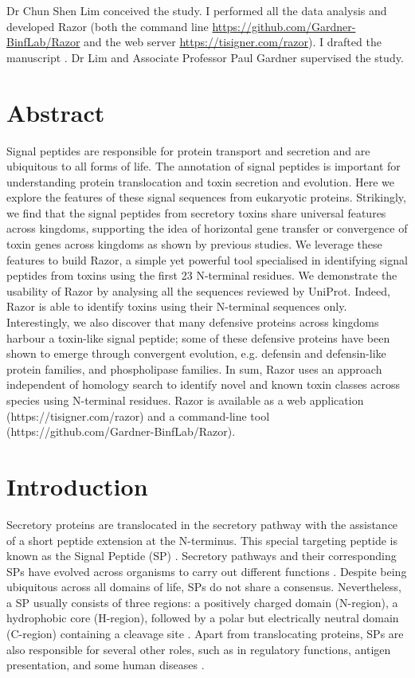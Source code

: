 Dr Chun Shen Lim conceived the study. I performed all the data analysis and developed Razor (both the command line \href{https://github.com/Gardner-BinfLab/Razor}{https://github.com/Gardner-BinfLab/Razor} and the web server \href{https://tisigner.com/razor}{https://tisigner.com/razor}). I drafted the manuscript \cite{Bhandari2020-oj}. Dr Lim and Associate Professor Paul Gardner supervised the study. 

\section{Abstract}
Signal peptides are responsible for protein transport and secretion and are ubiquitous to all forms of life. The annotation of signal peptides is important for understanding protein translocation and toxin secretion and evolution. Here we explore the features of these signal sequences from eukaryotic proteins. Strikingly, we find that the signal peptides from secretory toxins share universal features across kingdoms, supporting the idea of horizontal gene transfer or convergence of toxin genes across kingdoms as shown by previous studies. We leverage these features to build Razor, a simple yet powerful tool specialised in identifying signal peptides from toxins using the first 23 N-terminal residues. We demonstrate the usability of Razor by analysing all the sequences reviewed by UniProt. Indeed, Razor is able to identify toxins using their N-terminal sequences only. Interestingly, we also discover that many defensive proteins across kingdoms harbour a toxin-like signal peptide; some of these defensive proteins have been shown to emerge through convergent evolution, e.g. defensin and defensin-like protein families, and phospholipase families. In sum, Razor uses an approach independent of homology search to identify novel and known toxin classes across species using N-terminal residues. Razor is available as a web application (https://tisigner.com/razor) and a command-line tool (https://github.com/Gardner-BinfLab/Razor).



\section{Introduction}
Secretory proteins are translocated in the secretory pathway with the assistance of a short peptide extension at the N-terminus. This special targeting peptide is known as the Signal Peptide (SP) \cite{Von_Heijne1990-sb}. Secretory pathways and their corresponding SPs have evolved across organisms to carry out different functions \cite{Hegde2006-od,Owji2018-hg}. Despite being ubiquitous across all domains of life, SPs do not share a consensus. Nevertheless, a SP usually consists of three regions: a positively charged domain (N-region), a hydrophobic core (H-region), followed by a polar but electrically neutral domain (C-region) containing a cleavage site \cite{Von_Heijne1985-qv,Von_Heijne1990-sb,Nielsen1998-dy}. Apart from translocating proteins, SPs are also responsible for several other roles, such as in regulatory functions, antigen presentation, and some human diseases \cite{Borrego1998-la,Datta2007-av,Owji2018-hg}.

